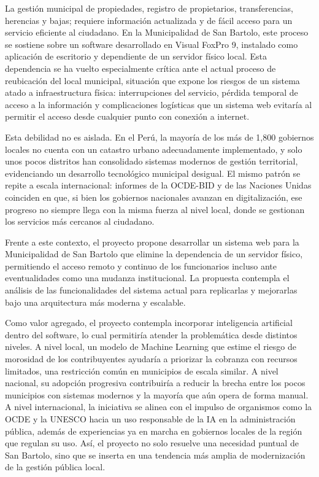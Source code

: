 \documentclass[12pt,a4paper]{report}
\begin{document}
La gestión municipal de propiedades, registro de propietarios, transferencias, herencias y bajas; requiere información actualizada y de fácil acceso para un servicio eficiente al ciudadano. En la Municipalidad de San Bartolo, este proceso se sostiene sobre un software desarrollado en Visual FoxPro 9, instalado como aplicación de escritorio y dependiente de un servidor físico local. Esta dependencia se ha vuelto especialmente crítica ante el actual proceso de reubicación del local municipal, situación que expone los riesgos de un sistema atado a infraestructura física: interrupciones del servicio, pérdida temporal de acceso a la información y complicaciones logísticas que un sistema web evitaría al permitir el acceso desde cualquier punto con conexión a internet.

Esta debilidad no es aislada. En el Perú, la mayoría de los más de 1,800 gobiernos locales no cuenta con un catastro urbano adecuadamente implementado, y solo unos pocos distritos han consolidado sistemas modernos de gestión territorial, evidenciando un desarrollo tecnológico municipal desigual. El mismo patrón se repite a escala internacional: informes de la OCDE-BID y de las Naciones Unidas coinciden en que, si bien los gobiernos nacionales avanzan en digitalización, ese progreso no siempre llega con la misma fuerza al nivel local, donde se gestionan los servicios más cercanos al ciudadano.

Frente a este contexto, el proyecto propone desarrollar un sistema web para la Municipalidad de San Bartolo que elimine la dependencia de un servidor físico, permitiendo el acceso remoto y continuo de los funcionarios incluso ante eventualidades como una mudanza institucional. La propuesta contempla el análisis de las funcionalidades del sistema actual para replicarlas y mejorarlas bajo una arquitectura más moderna y escalable.

Como valor agregado, el proyecto contempla incorporar inteligencia artificial dentro del software, lo cual permitiría atender la problemática desde distintos niveles. A nivel local, un modelo de Machine Learning que estime el riesgo de morosidad de los contribuyentes ayudaría a priorizar la cobranza con recursos limitados, una restricción común en municipios de escala similar. A nivel nacional, su adopción progresiva contribuiría a reducir la brecha entre los pocos municipios con sistemas modernos y la mayoría que aún opera de forma manual. A nivel internacional, la iniciativa se alinea con el impulso de organismos como la OCDE y la UNESCO hacia un uso responsable de la IA en la administración pública, además de experiencias ya en marcha en gobiernos locales de la región que regulan su uso. Así, el proyecto no solo resuelve una necesidad puntual de San Bartolo, sino que se inserta en una tendencia más amplia de modernización de la gestión pública local.
\end{document}
